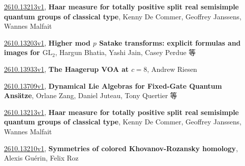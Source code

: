 \documentclass[9pt, a4paper]{article}
\theoremstyle{plain}
\theoremstyle{definition}
\theoremstyle{remark}
\newcommand{\arxiv}[3]{\href{https://arxiv.org/abs/#1}{#1}, \textbf{\textcolor{arxivblue}{#2}}, #3}
\begin{document}
\arxiv{2610.13213v1}{Haar measure for totally positive split real semisimple quantum groups of classical type}{Kenny De Commer, Geoffrey Janssens, Wannes Malfait}

\arxiv{2610.13203v1}{Higher mod $p$ Satake transforms: explicit formulas and images for $\mathrm{GL}_2$}{Hargun Bhatia, Yashi Jain, Casey Perdue 等}

\arxiv{2610.13933v1}{The Haagerup VOA at $c=8$}{Andrew Riesen}

\arxiv{2610.13709v1}{Dynamical Lie Algebras for Fixed-Gate Quantum Ansätze}{Orlane Zang, Daniel Juteau, Tony Quertier 等}

\arxiv{2610.13213v1}{Haar measure for totally positive split real semisimple quantum groups of classical type}{Kenny De Commer, Geoffrey Janssens, Wannes Malfait}

\arxiv{2610.13210v1}{Symmetries of colored Khovanov-Rozansky homology}{Alexis Guérin, Felix Roz}

\end{document}
